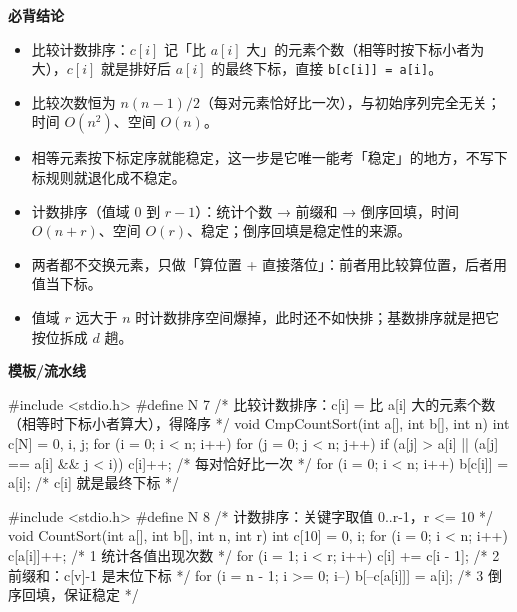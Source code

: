 \documentclass[10pt,a4paper]{ctexart}
\begin{document}



\textbf{必背结论}

\begin{itemize}

\item 比较计数排序：$c[i]$ 记「比 $a[i]$ 大」的元素个数（相等时按下标小者为大），$c[i]$ 就是排好后 $a[i]$ 的最终下标，直接 \texttt{b[c[i]] = a[i]}。

\item 比较次数恒为 $n(n-1)/2$（每对元素恰好比一次），与初始序列完全无关；时间 $O(n^2)$、空间 $O(n)$。

\item 相等元素按下标定序就能稳定，这一步是它唯一能考「稳定」的地方，不写下标规则就退化成不稳定。

\item 计数排序（值域 $0$ 到 $r-1$）：统计个数 → 前缀和 → 倒序回填，时间 $O(n+r)$、空间 $O(r)$、稳定；倒序回填是稳定性的来源。

\item 两者都不交换元素，只做「算位置 + 直接落位」：前者用比较算位置，后者用值当下标。

\item 值域 $r$ 远大于 $n$ 时计数排序空间爆掉，此时还不如快排；基数排序就是把它按位拆成 $d$ 趟。

\end{itemize}

\textbf{模板/流水线}

\begin{codebox}
#include <stdio.h>
#define N 7
/* 比较计数排序：c[i] = 比 a[i] 大的元素个数（相等时下标小者算大），得降序 */
void CmpCountSort(int a[], int b[], int n) {
    int c[N] = {0}, i, j;
    for (i = 0; i < n; i++)
        for (j = 0; j < n; j++)
            if (a[j] > a[i] || (a[j] == a[i] && j < i)) c[i]++;  /* 每对恰好比一次 */
    for (i = 0; i < n; i++) b[c[i]] = a[i];                     /* c[i] 就是最终下标 */
}
\end{codebox}

\begin{codebox}
#include <stdio.h>
#define N 8
/* 计数排序：关键字取值 0..r-1，r <= 10 */
void CountSort(int a[], int b[], int n, int r) {
    int c[10] = {0}, i;
    for (i = 0; i < n; i++) c[a[i]]++;                  /* 1 统计各值出现次数 */
    for (i = 1; i < r; i++) c[i] += c[i - 1];           /* 2 前缀和：c[v]-1 是末位下标 */
    for (i = n - 1; i >= 0; i--) b[--c[a[i]]] = a[i];   /* 3 倒序回填，保证稳定 */
}
\end{codebox}
\end{document}
